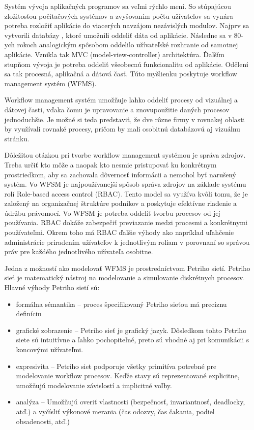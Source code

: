 Systém vývoja aplikačných programov sa veľmi rýchlo mení. So stúpajúcou zložitosťou počítačových systémov a zvyšovaním počtu užívateľov sa vynára potreba rozložiť aplikácie do viacerých navzájom nezávislých modulov. Najprv sa vytvorili databázy , ktoré umožnili oddeliť dáta od aplikácie. Následne sa v 80-ych rokoch analogickým spôsobom  oddelilo užívateľské rozhranie od samotnej aplikácie. Vznikla tak MVC (model-view-controller) architektúra. Ďalším stupňom vývoja je potreba oddeliť všeobecnú funkcionalitu od aplikácie. Odčlení sa tak procesná, aplikačná a dátová časť. Túto myšlienku poskytuje workflow management systém (WFMS).

Workflow management systém umožňuje  ľahko oddeliť procesy od vizuálnej a dátovej časti, vďaka čomu je upravovanie a znovupoužitie daných procesov jednoduchšie. Je možné si teda predstaviť, že dve rôzne firmy v rovnakej oblasti by využívali rovnaké procesy, pričom by mali osobitnú databázovú aj vizuálnu stránku.

Dôležitou otázkou pri tvorbe workflow management systémou je správa zdrojov. Treba určiť kto môže a naopak kto nesmie pristupovať ku konkrétnym prostriedkom, aby sa zachovala dôvernosť informácii a nemohol byť narušený systém.
Vo WFSM je najpoužívanejší spôsob správa zdrojov na základe systému rolí Role-based access control (RBAC). Tento model sa využíva kvôli tomu, že je založený na organizačnej štruktúre podnikov a poskytuje efektívne riadenie a údržbu právomocí. Vo WFSM je potreba oddeliť  tvorbu procesov od jej používania. RBAC dokáže zabezpečiť previazanie medzi procesmi a konkrétnymi používateľmi. Okrem toho má RBAC ďaľšie výhody ako napríklad uľahčenie administrácie priradením užívateľov k jednotlivým roliam v porovnaní so správou práv pre každého jednotlivého užívateľa osobitne. 

Jedna z možností ako modelovať WFMS je prostredníctvom Petriho sietí. Petriho sieť je matematický nástroj na modelovanie a simulovanie diskrétnych procesov.  Hlavné výhody Petriho sietí sú:
\begin{itemize}
	\item formálna sémantika – proces špecifikovaný Petriho sieťou má precíznu definíciu
	\item grafické zobrazenie – Petriho sieť je grafický jazyk. Dôsledkom tohto Petriho siete
	sú intuitívne a ľahko pochopiteľné, preto sú vhodné aj pri komunikácii
	s koncovými užívateľmi.
	\item expresivita – Petriho siet podporuje všetky primitíva potrebné pre modelovanie
	workflow procesov. Keďže stavy sú reprezentované explicitne, umožňujú
	modelovanie závislostí a implicitné voľby.
	\item analýza – Umožňujú overiť vlastnosti (bezpečnosť, invariantnosť, deadlocky, atď.)
	a vyčísliť výkonové merania (čas odozvy, čas čakania, podiel obsadenosti, atď.)
\end{itemize}



